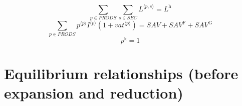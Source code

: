 \begin{equation}
\sum_{p\in {P\!R\!O\!D\!S}} \sum_{s\in {S\!E\!C}} {L}^{\langle p,s\rangle} = L^{\mathrm{h}}
\end{equation}
\begin{equation}
\sum_{p\in {P\!R\!O\!D\!S}} {{p}^{\langle p\rangle}} {{I}^{\langle p\rangle}} \left(1 + {{v\!a\!t}}^{\langle p\rangle}\right) = {S\!A\!V} + {S\!A\!V}^{\mathrm{F}} + {S\!A\!V}^{\mathrm{G}}
\end{equation}
\begin{equation}
p^{\mathrm{k}} = 1
\end{equation}




\section{Equilibrium relationships (before expansion and reduction)}

